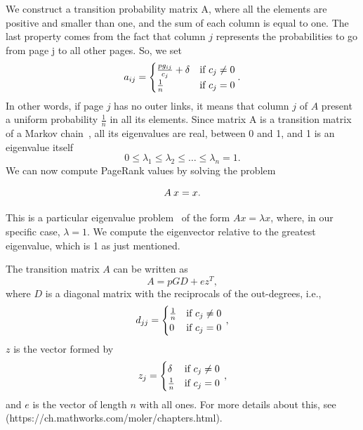 \documentclass[]{usiinfbachelorproject}
\begin{document}
We construct a transition probability matrix A, where all the elements are positive and smaller than one, and the sum of each column is equal to one.
The last property comes from the fact that column $j$ represents the probabilities to go from page j to all other pages. So, we set
\begin{equation}\notag
a_{ij} = 
\begin{cases}
\frac{pg_{ij}}{c_{j}} + \delta  & \text{if } c_{j} \neq 0\\
\frac{1}{n} & \text{if } c_{j} = 0
\end{cases}.
\end{equation}
In other words, if page $j$ has no outer links, it means that column $j$ of $A$ present a uniform probability $\frac{1}{n}$ in all its elements. Since matrix A is a transition matrix of a Markov chain~\cite{MarkovChain}, all its eigenvalues are real, between 0 and 1, and 1 is an eigenvalue itself
$$0 \leq \lambda_1 \leq \lambda_2 \leq \dots \leq \lambda_n = 1 \text{.}$$
We can now compute PageRank values by solving the problem 

\begin{equation}\notag
A\:x = x \text{.}
\end{equation}

This is a particular eigenvalue problem~\cite{eigenproblem} of the form $Ax=\lambda x$, where, in our specific case, $\lambda = 1$. We compute the eigenvector relative to the greatest eigenvalue, which is 1 as just mentioned.

The transition matrix $A$ can be written as
$$A = pGD+ez^{T}, $$
where $D$ is a diagonal matrix with the reciprocals of the out-degrees, i.e.,
\begin{equation}\notag
d_{jj} = 
\begin{cases}
\frac{1}{n} & \text{if } c_{j} \neq 0\\
0 & \text{if } c_{j} = 0
\end{cases} \,,
\end{equation}
$z$ is the vector formed by
\begin{equation}\notag
z_{j} = 
\begin{cases}
\delta & \text{if } c_{j} \neq 0\\
\frac{1}{n} & \text{if } c_{j} = 0
\end{cases} \,,
\end{equation}
and $e$ is the vector of length $n$ with all ones. For more details about this, see~\cite[Chapter 7]{molerPR} (https://ch.mathworks.com/moler/chapters.html).
\end{document}
